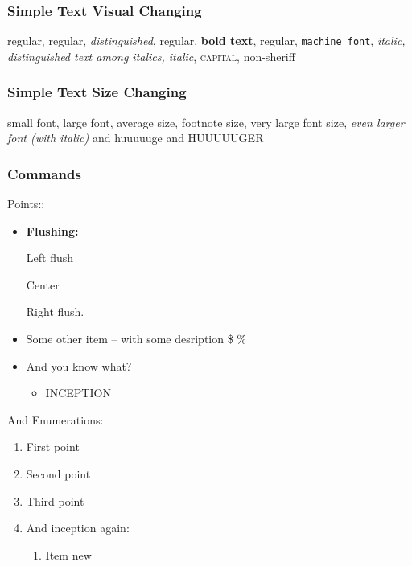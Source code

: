 \subsubsection{Simple Text Visual Changing} %

regular, regular, \emph{distinguished}, regular, \textbf{bold text}, regular, \texttt{machine font}, \textit{ italic, {\em distinguished text among italics}, italic}, \textsc{capital}, \textsf{non-sheriff}


\subsubsection{Simple Text Size Changing}

{\small small font}, {\large large font}, average size, {\footnotesize footnote size}, {\Large very large font size},
\textit{\LARGE even larger font (with italic)} {\huge and huuuuuge} {\Huge and HUUUUUGER}

\subsubsection{Commands}


Points:: %
\begin{itemize}
    \item \textbf{Flushing:}
        \begin{flushleft}
        Left flush
        \end{flushleft}
        \begin{center}
        Center
        \end{center}
        \begin{flushright}
        Right flush.
        \end{flushright}
    \item Some other item -- with some desription \$ \%
    \item And you know what?
        \begin{itemize} %
        \item INCEPTION
        \end{itemize}
\end{itemize}

And Enumerations: %
\begin{enumerate}
    \item First point
    \item Second point
    \item Third point
    \item And inception again:
    \begin{enumerate}
        \item Item new
    \end{enumerate}
\end{enumerate}